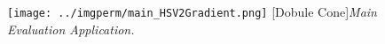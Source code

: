 \begin{figure}[H]
\centering
\texttt{[image: ../imgperm/main\_HSV2Gradient.png]}
[Dobule Cone]{\textit{Main Evaluation Application.}}
\label{fig:main_HSV2Gradient}
\end{figure}
